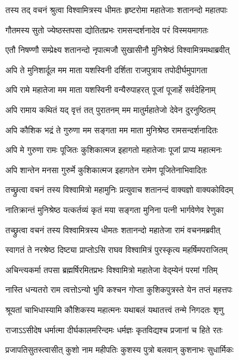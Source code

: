 
\twolineshloka
{तस्य तद् वचनं श्रुत्वा विश्वामित्रस्य धीमतः}
{हृष्टरोमा महातेजाः शतानन्दो महातपाः} %

\twolineshloka
{गौतमस्य सुतो ज्येष्ठस्तपसा द्योतितप्रभः}
{रामसन्दर्शनादेव परं विस्मयमागतः} %

\twolineshloka
{एतौ निषण्णौ सम्प्रेक्ष्य शतानन्दो नृपात्मजौ}
{सुखासीनौ मुनिश्रेष्ठं विश्वामित्रमथाब्रवीत्} %

\twolineshloka
{अपि ते मुनिशार्दूल मम माता यशस्विनी}
{दर्शिता राजपुत्राय तपोदीर्घमुपागता} %

\twolineshloka
{अपि रामे महातेजा मम माता यशस्विनी}
{वन्यैरुपाहरत् पूजां पूजार्हे सर्वदेहिनाम्} %

\twolineshloka
{अपि रामाय कथितं यद् वृत्तं तत् पुरातनम्}
{मम मातुर्महातेजो देवेन दुरनुष्ठितम्} %

\twolineshloka
{अपि कौशिक भद्रं ते गुरुणा मम सङ्गता}
{मम माता मुनिश्रेष्ठ रामसन्दर्शनादितः} %

\twolineshloka
{अपि मे गुरुणा रामः पूजितः कुशिकात्मज}
{इहागतो महातेजाः पूजां प्राप्य महात्मनः} %

\twolineshloka
{अपि शान्तेन मनसा गुरुर्मे कुशिकात्मज}
{इहागतेन रामेण पूजितेनाभिवादितः} %

\twolineshloka
{तच्छ्रुत्वा वचनं तस्य विश्वामित्रो महामुनिः}
{प्रत्युवाच शतानन्दं वाक्यज्ञो वाक्यकोविदम्} %

\twolineshloka
{नातिक्रान्तं मुनिश्रेष्ठ यत्कर्तव्यं कृतं मया}
{सङ्गता मुनिना पत्नी भार्गवेणेव रेणुका} %

\twolineshloka
{तच्छ्रुत्वा वचनं तस्य विश्वामित्रस्य धीमतः}
{शतानन्दो महातेजा रामं वचनमब्रवीत्} %

\twolineshloka
{स्वागतं ते नरश्रेष्ठ दिष्ट्या प्राप्तोऽसि राघव}
{विश्वामित्रं पुरस्कृत्य महर्षिमपराजितम्} %

\twolineshloka
{अचिन्त्यकर्मा तपसा ब्रह्मर्षिरमितप्रभः}
{विश्वामित्रो महातेजा वेद्म्येनं परमां गतिम्} %

\twolineshloka
{नास्ति धन्यतरो राम त्वत्तोऽन्यो भुवि कश्चन}
{गोप्ता कुशिकपुत्रस्ते येन तप्तं महत्तपः} %

\twolineshloka
{श्रूयतां चाभिधास्यामि कौशिकस्य महात्मनः}
{यथाबलं यथातत्त्वं तन्मे निगदतः शृणु} %

\twolineshloka
{राजाऽऽसीदेष धर्मात्मा दीर्घकालमरिन्दमः}
{धर्मज्ञः कृतविद्यश्च प्रजानां च हिते रतः} %

\twolineshloka
{प्रजापतिसुतस्त्वासीत् कुशो नाम महीपतिः}
{कुशस्य पुत्रो बलवान् कुशनाभः सुधार्मिकः} %

